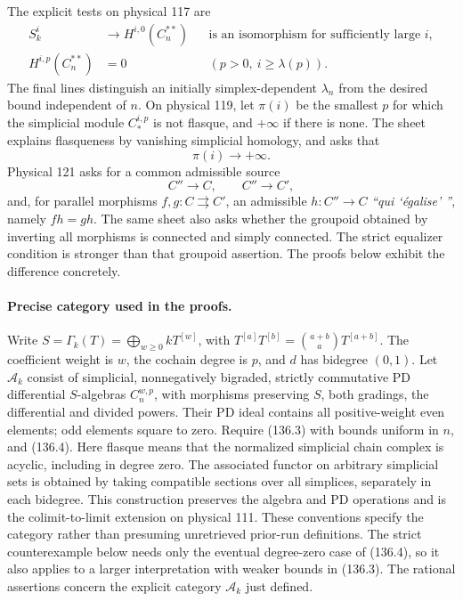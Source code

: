 The explicit tests on physical 117 are
\begin{equation}
 \begin{aligned}
 S_k^i&\longrightarrow H^{i,0}(C_n^{**})
  &&\text{is an isomorphism for sufficiently large }i,\\
 H^{i,p}(C_n^{**})&=0
  &&(p>0,\ i\geq\lambda(p)).
 \end{aligned}                                           \tag{136.3}
\end{equation}
The final lines distinguish an initially simplex-dependent
$\lambda_n$ from the desired bound independent of $n$.
On physical 119, let $\pi(i)$ be the smallest $p$ for which the
simplicial module $C_*^{i,p}$ is not flasque, and $+\infty$ if
there is none.  The sheet explains flasqueness by vanishing
simplicial homology, and asks that
\[
                         \pi(i)\longrightarrow+\infty.
                                                               \tag{136.4}
\]
Physical 121 asks for a common admissible source
\[
 C''\longrightarrow C,\qquad C''\longrightarrow C',              \tag{136.a}
\]
and, for parallel morphisms $f,g:C\rightrightarrows C'$, an
admissible $h:C''\to C$ \emph{``qui `\'egalise' ''}, namely
$fh=gh$.  The same sheet also asks whether the groupoid obtained
by inverting all morphisms is connected and simply connected.
The strict equalizer condition is stronger than that groupoid
assertion.  The proofs below exhibit the difference concretely.

\paragraph{Precise category used in the proofs.}
Write $S=\Gamma_k(T)=\bigoplus_{w\geq0}kT^{[w]}$, with
$T^{[a]}T^{[b]}=\binom{a+b}{a}T^{[a+b]}$.
The coefficient weight is $w$, the cochain degree is $p$, and
$d$ has bidegree $(0,1)$.  Let $\mathcal A_k$ consist of simplicial,
nonnegatively bigraded, strictly commutative PD differential
$S$-algebras $C_n^{w,p}$, with morphisms preserving $S$, both
gradings, the differential and divided powers.  Their PD ideal
contains all positive-weight even elements; odd elements square
to zero.  Require (136.3) with bounds uniform in $n$, and
(136.4).  Here flasque means that the normalized simplicial
chain complex is acyclic, including in degree zero.
The associated functor on arbitrary simplicial sets is obtained
by taking compatible sections over all simplices, separately in
each bidegree.  This construction preserves the algebra and PD
operations and is the colimit-to-limit extension on physical 111.
These conventions specify the category rather than presuming
unretrieved prior-run definitions.  The strict counterexample
below needs only the eventual degree-zero case of (136.4), so
it also applies to a larger interpretation with weaker bounds
in (136.3).  The rational assertions concern the explicit
category $\mathcal A_k$ just defined.


